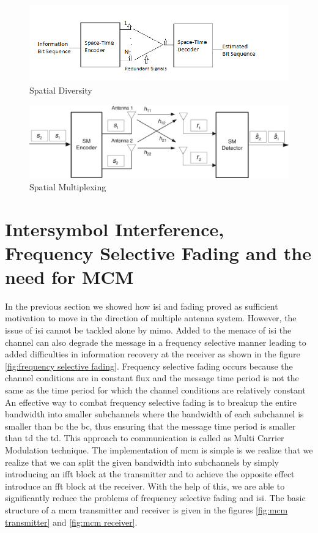 \begin{figure}[!htbp]
\centering
\includegraphics[scale=0.6]{Chapter 2/Figures/Spatial Diversity}
\caption{Spatial Diversity}
\label{fig:spatial diversity}
\end{figure}
\begin{figure}[!htbp]
\centering
\includegraphics[scale=0.7]{Chapter 2/Figures/Spatial Multiplexing}
\caption{Spatial Multiplexing}
\label{fig:spatial multiplexing}
\end{figure}
\section{Intersymbol Interference, Frequency Selective Fading and the need for MCM}
In the previous section we showed how \acrshort{isi} and fading proved as sufficient motivation to move in the direction of multiple antenna system. However, the issue of \acrshort{isi} cannot be tackled alone by \acrshort{mimo}. Added to the menace of \acrshort{isi} the channel can also degrade the message in a frequency selective manner leading to added difficulties in information recovery at the receiver as shown in the figure \ref{fig:frequency selective fading}. Frequency selective fading occurs because the channel conditions are in constant flux and the message time period is not the same as the time period for which the channel conditions are relatively constant\\
An effective way to combat frequency selective fading is to breakup the entire bandwidth into smaller subchannels where the bandwidth of each subchannel is smaller than \acrshort{bc} the \acrlong{bc}, thus ensuring that the message time period is smaller than \acrshort{td} the \acrlong{td}. This approach to communication is called as Multi Carrier Modulation technique. The implementation of \acrshort{mcm} is simple is we realize that we realize that we can split the given bandwidth into subchannels by simply introducing an \acrshort{ifft} block at the transmitter and to achieve the opposite effect introduce an \acrshort{fft} block at the receiver. With the help of this, we are able to significantly reduce the problems of frequency selective fading and \acrshort{isi}. The basic structure of a \acrshort{mcm} transmitter and receiver is given in the figures \ref{fig:mcm transmitter} and \ref{fig:mcm receiver}.

